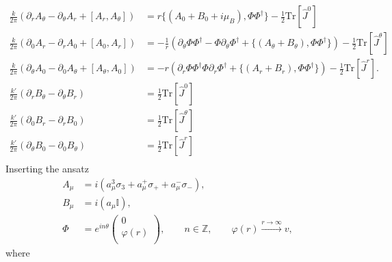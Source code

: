 \begin{align}
    \frac{k}{2\pi} \left(\partial_r A_{\theta} - \partial_{\theta} A_r + [A_r, A_{\theta}]\right) &= r \big\lbrace (A_0 +B_0+ i \mu_B ) , \Phi \Phi^{\dag} \big\rbrace - \frac{1}{2} \mathrm{Tr} \left[ \hat{J}^0 \right] \\
    \frac{k}{2\pi} \left(\partial_0 A_r - \partial_r A_0 + [A_0, A_r]\right) &= -\frac{1}{r} \left(\partial_{\theta} \Phi \Phi^{\dag} -\Phi \partial_{\theta}\Phi^{\dag} + \big\lbrace (A_{\theta} +B_{\theta}), \Phi \Phi^{\dag} \big\rbrace \right) - \frac{1}{2} \mathrm{Tr} \left[ \hat{J}^{\theta} \right]\\
    \frac{k}{2 \pi} \left(\partial_{\theta} A_0 - \partial_{0} A_{\theta} + [A_{\theta}, A_0]\right) &=-r \left(\partial_{r} \Phi \Phi^{\dag} \Phi \partial_r \Phi^{\dag} + \big\lbrace (A_r +B_r), \Phi \Phi^{\dag} \big\rbrace \right) - \frac{1}{2} \mathrm{Tr} \left[ \hat{J}^r \right]. \\
    \frac{k'}{2 \pi} \left( \partial_r B_{\theta}- \partial_{\theta} B_r\right) &= \frac{1}{2} \mathrm{Tr} [\hat{J}^0]\\
    \frac{k'}{2 \pi} \left( \partial_0 B_{r}- \partial_{r} B_0\right) &= \frac{1}{2} \mathrm{Tr} [\hat{J}^{\theta}]\\
    \frac{k'}{2 \pi} \left( \partial_{\theta} B_{0}- \partial_{0} B_{\theta}\right) &= \frac{1}{2} \mathrm{Tr} [\hat{J}^r]\\
\end{align}
Inserting the ansatz
\begin{align}
    A_{\mu} &= i \left(a_{\mu}^3 \sigma_3 + a_{\mu}^+ \sigma_{+} +a_{\mu}^{-} \sigma_{-} \right), \\
    B_{\mu} &= i \left( a_{\mu} \mathbb{I} \right), \\
    \Phi &=  e^{i n \theta} \begin{pmatrix}
        0\\
        \varphi(r)\\
    \end{pmatrix}, \qquad n\in \mathbb{Z}, \qquad \varphi(r) \xrightarrow{r \rightarrow \infty} v,
\end{align}
    where

